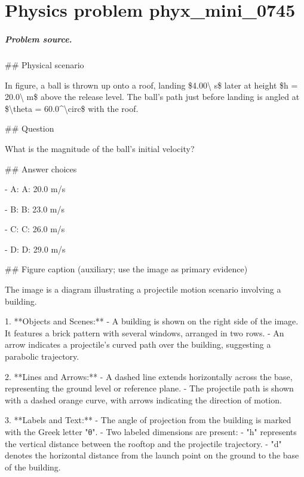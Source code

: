 
\chapter{Physics problem phyx\_mini\_0745}
\label{ch:PhyXMiniProblems_problem_phyx_mini_0745}

\paragraph{Problem source.}
\#\# Physical scenario

In figure, a ball is thrown up onto a roof, landing \$4.00\textbackslash{} s\$ later at height \$h = 20.0\textbackslash{} m\$ above the release level. The ball's path just before landing is angled at \$\textbackslash{}theta = 60.0\textasciicircum{}\textbackslash{}circ\$ with the roof.

\#\# Question

What is the magnitude of the ball's initial velocity?

\#\# Answer choices

- A: A: 20.0 m/s

- B: B: 23.0 m/s

- C: C: 26.0 m/s

- D: D: 29.0 m/s

\#\# Figure caption (auxiliary; use the image as primary evidence)

The image is a diagram illustrating a projectile motion scenario involving a building.

1. **Objects and Scenes:**
   - A building is shown on the right side of the image. It features a brick pattern with several windows, arranged in two rows.
   - An arrow indicates a projectile's curved path over the building, suggesting a parabolic trajectory.

2. **Lines and Arrows:**
   - A dashed line extends horizontally across the base, representing the ground level or reference plane.
   - The projectile path is shown with a dashed orange curve, with arrows indicating the direction of motion.

3. **Labels and Text:**
   - The angle of projection from the building is marked with the Greek letter "θ".
   - Two labeled dimensions are present:
     - "h" represents the vertical distance between the rooftop and the projectile trajectory.
     - "d" denotes the horizontal distance from the launch point on the ground to the base of the building.

